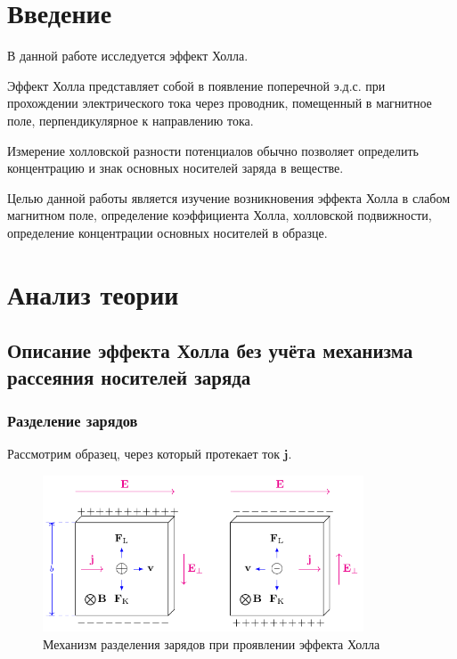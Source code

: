 



\def\labauthors{Понур К.А., Сарафанов Ф.Г., Сидоров Д.А.}
\def\labgroup{420}
\def\labnumber{204}
\def\labtheme{Эффект Холла}
\renewcommand{\vec}{\mathbf}


\tableofcontents
\newpage

\section*{Введение}
\label{sec:input}

В данной работе исследуется эффект Холла.

Эффект Холла представляет собой в появление поперечной э.д.с. при прохождении 
электрического тока через проводник, помещенный в магнитное поле, перпендикулярное к направлению тока. 

Измерение холловской разности потенциалов обычно позволяет определить концентрацию и знак основных носителей заряда в веществе.

Целью данной работы является изучение возникновения эффекта Холла в слабом магнитном поле, определение коэффициента Холла, холловской подвижности, определение концентрации основных носителей в образце.

\section{Анализ теории}
\subsection[Описание эффекта Холла]{Описание эффекта Холла без учёта механизма рассеяния носителей заряда}
\subsubsection{Разделение зарядов}
Рассмотрим образец, через который протекает ток $\vec{j}$.
\begin{figure}[H]
	\centering
	\includegraphics[width=0.85\textwidth]{img/effect}
	\caption{Механизм разделения зарядов при проявлении эффекта Холла}
	\label{fig:figure1}
\end{figure}

